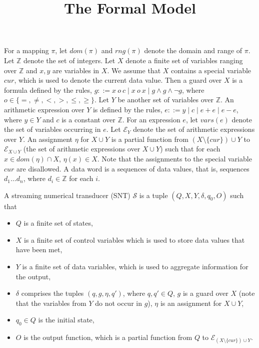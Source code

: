 \documentclass[runningheads,a4paper]{llncs}
\title{The Formal Model}
\author{}
\institute{}
\def\Ee{{\mathcal{E} }}
\def\Nn{{\mathbb{N} }}
\def\Ss{{\mathcal{S} }}
\def\Ii{{\mathbb{Z} }}
\begin{document}
\maketitle


For a mapping $\pi$, let $dom(\pi)$ and $rng(\pi)$ denote the domain and range of $\pi$.
Let $\Ii$ denote the set of integers. Let $X$ denote a finite set of variables ranging over $\Ii$ and $x,y$ are variables in $X$. We assume that $X$ contains a special variable $cur$, which is used to denote the current data value. Then a guard over $X$ is a formula defined by the rules, $g::= x\ o\ c \mid x\ o\ x \mid g \wedge g \wedge \neg g$, where $o \in \{=,\neq,<, >, \le, \ge\}$. Let $Y$ be another set of variables over $\Ii$. An arithmetic expression over $Y$ is defined by the rules, $e::= y \mid c \mid e + e \mid e-e$, where $y \in Y$ and $c$ is a constant over $\Ii$. For an expression $e$, let $vars(e)$ denote the set of variables occurring in $e$. Let $\Ee_Y$ denote the set of arithmetic expressions over $Y$. An assignment $\eta$ for $X \cup Y$ is a partial function from $(X \setminus \{cur\}) \cup Y$ to $\Ee_{X \cup Y}$ (the set of arithmetic expressions over $X \cup Y$) such that for each $x \in dom(\eta) \cap X$, $\eta(x)\in X$. Note that the assignments to the special variable $cur$ are disallowed.
A data word is a sequences of data values, that is, sequences $d_1\dots d_n$, where $d_i \in \Ii$ for each $i$.

A streaming numerical transducer (SNT) $\Ss$ is a tuple $(Q, X, Y, \delta, q_0, O)$ such that 
\begin{itemize}
\item $Q$ is a finite set of states,
\item $X$ is a finite set of control variables which is used to store data values that have been met,
\item $Y$ is a finite set of data variables, which is used to aggregate information for the output,
\item $\delta$ comprises the tuples $(q,  g, \eta, q')$, where $q,q'\in Q$, $g$ is a guard over $X$ (note that the variables from $Y$ do not occur in $g$), $\eta$ is an assignment for $X \cup Y$, 

\item $q_0 \in Q$ is the initial state,
\item $O$ is the output function, which is a partial function from $Q$ to $\Ee_{(X \setminus \{cur\}) \cup Y}$.
\end{itemize}
\end{document}
